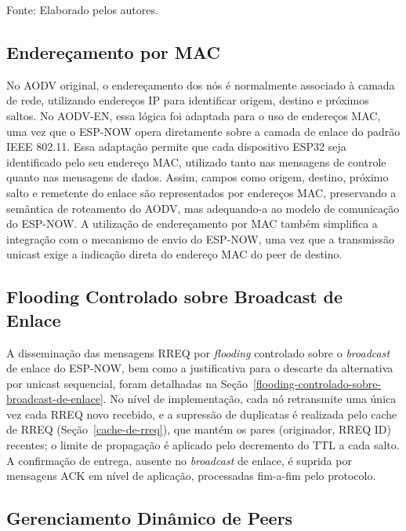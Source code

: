 Fonte: Elaborado pelos autores.

\subsection{Endereçamento por MAC}\label{endereuxe7amento-por-mac}

No AODV original, o endereçamento dos nós é normalmente associado à
camada de rede, utilizando endereços IP para identificar origem, destino
e próximos saltos. No AODV-EN, essa lógica foi adaptada para o uso de
endereços MAC, uma vez que o ESP-NOW opera diretamente sobre a camada de
enlace do padrão IEEE 802.11. Essa adaptação permite que cada
dispositivo ESP32 seja identificado pelo seu endereço MAC, utilizado
tanto nas mensagens de controle quanto nas mensagens de dados. Assim,
campos como origem, destino, próximo salto e remetente do enlace são
representados por endereços MAC, preservando a semântica de roteamento
do AODV, mas adequando-a ao modelo de comunicação do ESP-NOW. A
utilização de endereçamento por MAC também simplifica a integração com o
mecanismo de envio do ESP-NOW, uma vez que a transmissão unicast exige a
indicação direta do endereço MAC do peer de destino.

\subsection{Flooding Controlado sobre Broadcast de Enlace}\label{flooding-controlado-sobre-broadcast-de-enlace-2}

A disseminação das mensagens RREQ por \emph{flooding} controlado sobre o
\emph{broadcast} de enlace do ESP-NOW, bem como a justificativa para o
descarte da alternativa por unicast sequencial, foram detalhadas na
Seção~\ref{flooding-controlado-sobre-broadcast-de-enlace}. No nível de
implementação, cada nó retransmite uma única vez cada RREQ novo recebido,
e a supressão de duplicatas é realizada pelo cache de RREQ
(Seção~\ref{cache-de-rreq}), que mantém os pares (originador, RREQ ID)
recentes; o limite de propagação é aplicado pelo decremento do TTL a cada
salto. A confirmação de entrega, ausente no \emph{broadcast} de enlace, é
suprida por mensagens ACK em nível de aplicação, processadas
fim-a-fim pelo protocolo.

\subsection{Gerenciamento Dinâmico de Peers}\label{gerenciamento-dinamico-de-peers}

